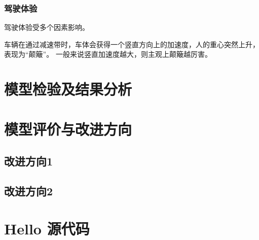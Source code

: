 \documentclass[withoutpreface,bwprint]{cumcmthesis}
\begin{document}
\subsubsection{驾驶体验}

驾驶体验受多个因素影响。

车辆在通过减速带时，车体会获得一个竖直方向上的加速度，人的重心突然上升，表现为“颠簸”。
一般来说竖直加速度越大，则主观上颠簸越厉害。

\section{模型检验及结果分析}

\section{模型评价与改进方向}

\subsection{改进方向1}

\subsection{改进方向2}



\nocite{*}


\newpage
\appendix
\section{Hello 源代码}

\end{document}
